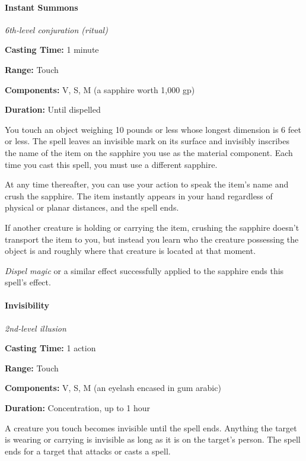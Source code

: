 \documentclass[
]{article}
\begin{document}
\hypertarget{instant-summons}{%
\paragraph{Instant Summons}\label{instant-summons}}

\emph{6th-level conjuration (ritual)}

\textbf{Casting Time:} 1 minute

\textbf{Range:} Touch

\textbf{Components:} V, S, M (a sapphire worth 1,000 gp)

\textbf{Duration:} Until dispelled

You touch an object weighing 10 pounds or less whose longest dimension
is 6 feet or less. The spell leaves an invisible mark on its surface and
invisibly inscribes the name of the item on the sapphire you use as the
material component. Each time you cast this spell, you must use a
different sapphire.

At any time thereafter, you can use your action to speak the item's name
and crush the sapphire. The item instantly appears in your hand
regardless of physical or planar distances, and the spell ends.

If another creature is holding or carrying the item, crushing the
sapphire doesn't transport the item to you, but instead you learn who
the creature possessing the object is and roughly where that creature is
located at that moment.

\emph{Dispel magic} or a similar effect successfully applied to the
sapphire ends this spell's effect.

\hypertarget{invisibility}{%
\paragraph{Invisibility}\label{invisibility}}

\emph{2nd-level illusion}

\textbf{Casting Time:} 1 action

\textbf{Range:} Touch

\textbf{Components:} V, S, M (an eyelash encased in gum arabic)

\textbf{Duration:} Concentration, up to 1 hour

A creature you touch becomes invisible until the spell ends. Anything
the target is wearing or carrying is invisible as long as it is on the
target's person. The spell ends for a target that attacks or casts a
spell.
\end{document}
